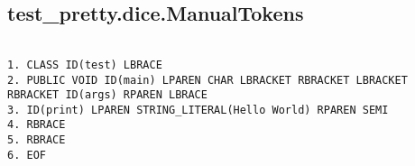 \subsection{test\_pretty.dice.ManualTokens}
\begin{verbatim}

1. CLASS ID(test) LBRACE
2. PUBLIC VOID ID(main) LPAREN CHAR LBRACKET RBRACKET LBRACKET RBRACKET ID(args) RPAREN LBRACE
3. ID(print) LPAREN STRING_LITERAL(Hello World) RPAREN SEMI
4. RBRACE
5. RBRACE
6. EOF

\end{verbatim}